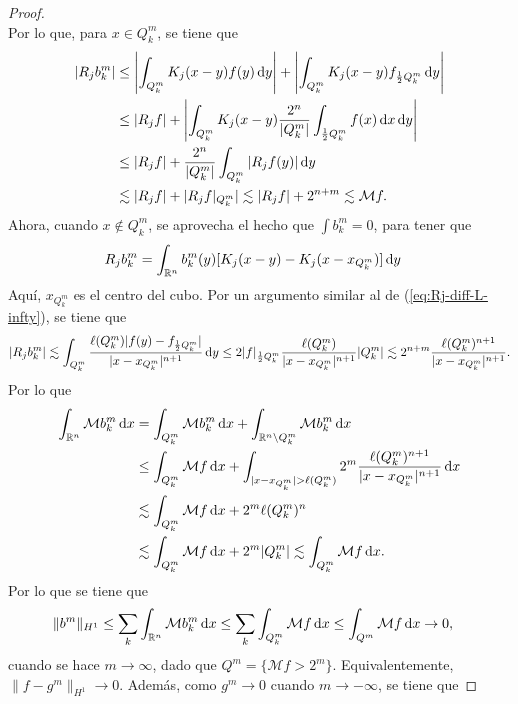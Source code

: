 \begin{proof}
\begin{equation*}
	\end{equation*}
	Por lo que, para $x\in Q_k^m$, se tiene que 
	\begin{align*}
		|R_jb_k^m| & \leq \left| \int_{Q_k^m} K_j(x-y)f(y) \mathop{}\!\mathrm{d} y \right| +\left| \int_{Q_k^m} K_j(x-y)f_{\frac{1}{2}Q_k^m} \mathop{}\!\mathrm{d} y \right|\\
		& \leq |R_jf| +\left| \int_{Q_k^m} K_j(x-y)\frac{2^n}{|Q_k^m|}\int_{\frac{1}{2}Q_k^m}f(x)\mathop{}\!\mathrm{d} x \mathop{}\!\mathrm{d} y \right| \\
		& \leq |R_jf| +\frac{2^n}{|Q_k^m|} \int_{Q_k^m} |R_jf(y)| \mathop{}\!\mathrm{d} y  \\
		& \lesssim |R_jf|  + |R_jf|_{Q_k^m}| \lesssim |R_jf| + 2^{n+m} \lesssim \mathcal{M}f.
	\end{align*}
	Ahora, cuando $x\notin Q_k^m$, se aprovecha el hecho que $\int b_k^m = 0$, para tener que 
	\begin{align*}
		R_jb_k^m&=  \int_{\mathbb{R}^n} b_k^m(y)[K_j(x-y) - K_j(x-x_{Q_k^m} )] \mathop{}\!\mathrm{d} y
	\end{align*}
	Aquí, $x_{Q_k^m}$ es el centro del cubo. Por un argumento similar al de (\ref{eq:Rj-diff-L-infty}), se tiene que 
	\begin{equation*}
		| R_jb_k^m |\lesssim \int_{Q_k^m} \frac{\ell(Q_k^m)|f(y) - f_{\frac{1}{2}Q_k^m}|}{|x-x_{Q_k^m}|^{n+1}} \mathop{}\!\mathrm{d} y \leq 2|f|_{\frac{1}{2}Q_k^m} \frac{\ell(Q_k^m)}{|x-x_{Q_k^m}|^{n+1}}|Q_k^m| \lesssim 2^{n+m}\frac{\ell(Q_k^m)^{n+1}}{|x-x_{Q_k^m}|^{n+1}}.
	\end{equation*}
	Por lo que 
	\begin{align*}
		\int_{\R^n}\mathcal{M}{b_k^m} \diff x &= \int_{Q_k^m}\mathcal{M}{b_k^m} \diff x + \int_{\R^n\setminus Q_k^m}\mathcal{M}{b_k^m} \diff x\\
		& \leq \int_{Q_k^m}\mathcal{M}f \diff x + \int_{|x-x_{Q_k^m}|>\ell(Q_k^m)} 2^{m}\frac{\ell(Q_k^m)^{n+1}}{|x-x_{Q_k^m}|^{n+1}} \diff x \\
		& \lesssim  \int_{Q_k^m}\mathcal{M}f \diff x + 2^m\ell(Q_k^m)^n\\
		 & \lesssim  \int_{Q_k^m}\mathcal{M}f \diff x + 2^m|Q_k^m| \lesssim  \int_{Q_k^m}\mathcal{M}f \diff x .
	\end{align*}
	Por lo que se tiene que 
	\begin{align*}
		\|b^m\|_{H^1} & \leq \sum_k	\int_{\mathbb{R}^n}\mathcal{M}{b_k^m} \mathop{}\!\mathrm{d} x \leq \sum_k \int_{Q_k^m} \mathcal{M}f\mathop{}\!\mathrm{d} x \leq \int_{Q^m}\mathcal{M}f\mathop{}\!\mathrm{d} x \to 0,
	\end{align*}
	cuando se hace $m\to\infty$, dado que $Q^m = \{\mathcal{M}f>2^m\}$. Equivalentemente, $\|f-g^m\|_{H^1} \to 0$. Además, como $g^m\to0$ cuando $m\to-\infty$, se tiene que 

\end{proof}
